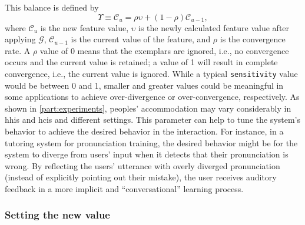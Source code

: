 This balance is defined by
%
\begin{equation}
	\Upsilon \equiv \mathcal{C}_u = \rho \upsilon + \left(1 - \rho \right) \mathcal{C}_{u-1},
	\label{eq:convergence_rate}
\end{equation}
\noindent
%
where $\mathcal{C}_u$ is the new feature value, $\upsilon$ is the newly calculated feature value after applying $\mathcal{G}$, $\mathcal{C}_{u-1}$ is the current value of the feature, and $\rho$ is the convergence rate.
A $\rho$ value of 0 means that the exemplars are ignored, i.e., no convergence occurs and the current value is retained; a value of 1 will result in complete convergence, i.e., the current value is ignored.
While a typical \texttt{sensitivity} value would be between 0 and 1, smaller and greater values could be meaningful in some applications to achieve over-divergence or over-convergence, respectively.
As shown in \cref{part:experiments}, peoples' accommodation may vary considerably in \acp{hhi} and \acp{hci} and different settings.
This parameter can help to tune the system's behavior to achieve the desired behavior in the interaction.
For instance, in a tutoring system for pronunciation training, the desired behavior might be for the system to diverge from users' input when it detects that their pronunciation is wrong.
By reflecting the users' utterance with overly diverged pronunciation (instead of explicitly pointing out their mistake), the user receives auditory feedback in a more implicit and \enquote{conversational} learning process.

\subsubsection{Setting the new value}
\label{subsubsec:setting_the_new_value}

